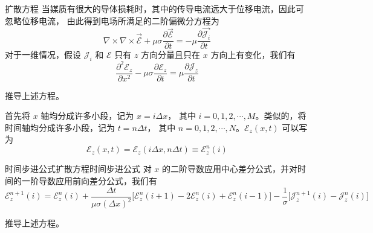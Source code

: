 \begin{theorem}{扩散方程}
    当媒质有很大的导体损耗时，其中的传导电流远大于位移电流，因此可忽略位移电流，
    由此得到电场所满足的二阶偏微分方程为
    \begin{equation}
        \nabla \times \nabla \times \vec{\mathscr{E}}
        +\mu \sigma \frac{\partial \vec{\mathscr{E}}}{\partial t}
        =-\mu \frac{\partial \vec{\mathscr{J}_i}}{\partial t}
    \end{equation}
    对于一维情况，假设 $\mathscr{J}_i$ 和 $\mathscr{E}$ 
    只有 $z$ 方向分量且只在 $x$ 方向上有变化，我们有
    \begin{equation}
        \frac{\partial^2 \mathscr{E}_z}{\partial x^2}
        -\mu \sigma \frac{\partial \mathscr{E}_z}{\partial t}
        =\mu \frac{\partial \mathscr{J}_z}{\partial t}
        \label{一维扩散方程}
    \end{equation}
\end{theorem}

\begin{exercise}
    推导上述方程。
\end{exercise}

\begin{definition}
    首先将 $x$ 轴均分成许多小段，记为 $x=i\Delta x$，
    其中 $i=0,1,2,\cdots,M$。类似的，将时间轴均分成许多小段，记为 $t=n\Delta t$，
    其中 $n=0,1,2,\cdots,N$。$\mathscr{E}_z(x,t)$ 可以写为
    \begin{equation}
        \mathscr{E}_z(x,t)=\mathscr{E}_z(i\Delta x,n\Delta t)
        \equiv \mathscr{E}_z^n(i)
    \end{equation}
\end{definition}

\begin{theorem}{时间步进公式}{扩散方程时间步进公式}
    对 $x$ 的二阶导数应用中心差分公式，并对时间的一阶导数应用前向差分公式，我们有
    \begin{equation}
        \mathscr{E}_z^{n+1}(i)=\mathscr{E}_z^n(i)
        +\frac{\Delta t}{\mu \sigma (\Delta x)^2}
        \Big[\mathscr{E}_z^n(i+1)-2\mathscr{E}_z^n(i)+\mathscr{E}_z^n(i-1)\Big]
        -\frac{1}{\sigma}\Big[\mathscr{J}_z^{n+1}(i)-\mathscr{J}_z^{n}(i)\Big]
    \end{equation}
\end{theorem}

\begin{exercise}
    推导上述方程。
\end{exercise}

